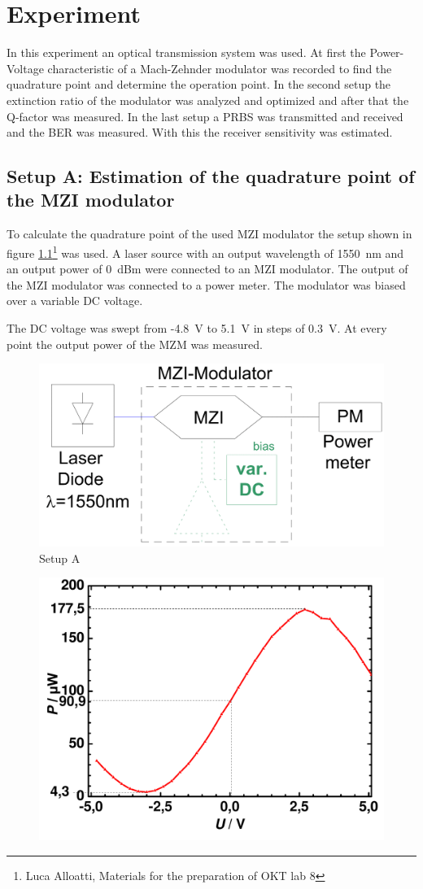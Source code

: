 \chapter{Experiment}
In this experiment an optical transmission system was used. At first the Power-Voltage characteristic of a Mach-Zehnder modulator was recorded to find the quadrature point and determine the operation point. In the second setup the extinction ratio of the modulator was analyzed and optimized and after that the Q-factor was measured. In the last setup a PRBS was transmitted and received and the BER was measured. With this the receiver sensitivity was estimated.  

\section{Setup A: Estimation of the quadrature point of the MZI modulator}
To calculate the quadrature point of the used MZI modulator the setup shown in figure \ref{fig:A_setup}\footnote[3]{Luca Alloatti, Materials for the preparation of OKT lab 8} was used. A laser source with an output wavelength of 1550~nm and an output power of 0~dBm were connected to an MZI modulator. The output of the MZI modulator was connected to a power meter. The modulator was biased over a variable DC voltage.

The DC voltage was swept from -4.8~V to 5.1~V in steps of 0.3~V. At every point the output power of the MZM was measured.

\begin{figure}%
\centering
\includegraphics[width=.5\columnwidth]{Grafiken/SetupA.png}%
\caption{Setup A}%
\label{fig:A_setup}%
\end{figure}

\begin{figure}%
\centering
\includegraphics[width=.6\columnwidth]{Grafiken/A_quadratur.pdf}%
\caption{}%
\label{fig:A_quadratur}%
\end{figure}

